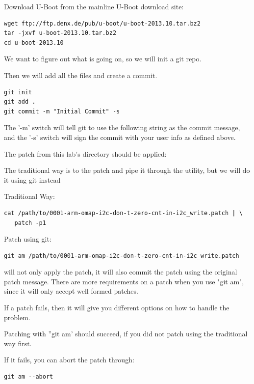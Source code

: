 Download U-Boot from the mainline U-Boot download site:

\begin{verbatim}
wget ftp://ftp.denx.de/pub/u-boot/u-boot-2013.10.tar.bz2
tar -jxvf u-boot-2013.10.tar.bz2
cd u-boot-2013.10
\end{verbatim}

We want to figure out what is going on, so we will init a git repo.

Then we will add all the files and create a commit.

\begin{verbatim}
git init
git add .
git commit -m "Initial Commit" -s
\end{verbatim}

The '-m' switch will tell git to use the following string as the commit message,
and the '-s' switch will sign the commit with your user info as defined above.

The  patch from
this lab's  directory should be applied:

The traditional way is to  the patch and pipe it through the  utility,
but we will do it using git instead

Traditional Way:
{\small
\begin{verbatim}
cat /path/to/0001-arm-omap-i2c-don-t-zero-cnt-in-i2c_write.patch | \
   patch -p1
\end{verbatim}
}

Patch using git:

{\small
\begin{verbatim}
git am /path/to/0001-arm-omap-i2c-don-t-zero-cnt-in-i2c_write.patch
\end{verbatim}
}

 will not only apply the patch, it will also commit the patch
using the original patch message. There are more requirements on a patch
when you use "git am", since it will only accept well formed patches.

If a patch fails, then it will give you different options on how to handle the problem.


Patching with ''git am' should succeed, if you did not patch using the traditional way first.

If it fails, you can abort the patch through:
{\small
\begin{verbatim}
git am --abort
\end{verbatim}
}

